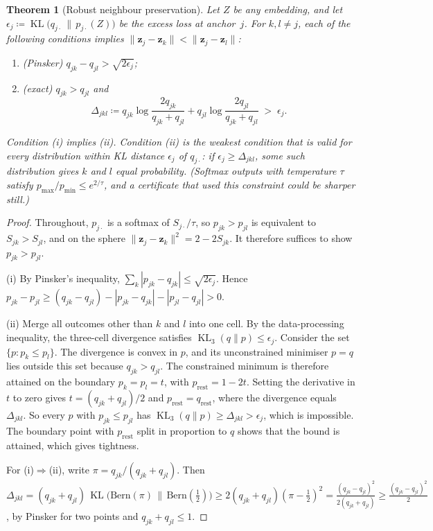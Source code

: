 \documentclass[11pt,a4paper]{article}
\theoremstyle{plain}
\newtheorem{theorem}{Theorem}[section]
\theoremstyle{definition}
\theoremstyle{remark}
\newcommand{\z}{\bm{z}}
\DeclareMathOperator{\KL}{KL}
\begin{document}
\begin{theorem}[Robust neighbour preservation]\label{thm:robustnn}
Let $Z$ be \emph{any} embedding, and let $\epsilon_j\coloneqq\KL\big(q_{j\cdot}\,\|\,p_{j\cdot}(Z)\big)$ be the excess loss at anchor~$j$. For $k,l\neq j$, each of the following conditions implies $\|\z_j-\z_k\|<\|\z_j-\z_l\|$:
\begin{enumerate}[label=(\roman*)]
  \item \emph{(Pinsker)} $q_{jk}-q_{jl}>\sqrt{2\epsilon_j}$;
  \item \emph{(exact)} $q_{jk}>q_{jl}$ and
  \[
    \Delta_{jkl}\coloneqq q_{jk}\log\frac{2q_{jk}}{q_{jk}+q_{jl}}+q_{jl}\log\frac{2q_{jl}}{q_{jk}+q_{jl}}\;>\;\epsilon_j .
  \]
\end{enumerate}
Condition (i) implies (ii). Condition (ii) is the weakest condition that is valid for every distribution within KL distance $\epsilon_j$ of $q_{j\cdot}$: if $\epsilon_j\ge\Delta_{jkl}$, some such distribution gives $k$ and $l$ equal probability. (Softmax outputs with temperature $\tau$ satisfy $p_{\max}/p_{\min}\le e^{2/\tau}$, and a certificate that used this constraint could be sharper still.)
\end{theorem}
\begin{proof}
Throughout, $p_{j\cdot}$ is a softmax of $S_{j\cdot}/\tau$, so $p_{jk}>p_{jl}$ is equivalent to $S_{jk}>S_{jl}$, and on the sphere $\|\z_j-\z_k\|^2=2-2S_{jk}$. It therefore suffices to show $p_{jk}>p_{jl}$.

(i) By Pinsker's inequality, $\sum_{k}|p_{jk}-q_{jk}|\le\sqrt{2\epsilon_j}$. Hence $p_{jk}-p_{jl}\ge(q_{jk}-q_{jl})-|p_{jk}-q_{jk}|-|p_{jl}-q_{jl}|>0$.

(ii) Merge all outcomes other than $k$ and $l$ into one cell. By the data-processing inequality, the three-cell divergence satisfies $\KL_3(q\|p)\le\epsilon_j$. Consider the set $\{p: p_k\le p_l\}$. The divergence is convex in $p$, and its unconstrained minimiser $p=q$ lies outside this set because $q_{jk}>q_{jl}$. The constrained minimum is therefore attained on the boundary $p_k=p_l=t$, with $p_{\text{rest}}=1-2t$. Setting the derivative in $t$ to zero gives $t=(q_{jk}+q_{jl})/2$ and $p_{\text{rest}}=q_{\text{rest}}$, where the divergence equals $\Delta_{jkl}$. So every $p$ with $p_{jk}\le p_{jl}$ has $\KL_3(q\|p)\ge\Delta_{jkl}>\epsilon_j$, which is impossible. The boundary point with $p_{\text{rest}}$ split in proportion to $q$ shows that the bound is attained, which gives tightness.

For (i)$\Rightarrow$(ii), write $\pi=q_{jk}/(q_{jk}+q_{jl})$. Then $\Delta_{jkl}=(q_{jk}+q_{jl})\,\KL\big(\text{Bern}(\pi)\,\|\,\text{Bern}(\tfrac12)\big)\ge 2(q_{jk}+q_{jl})(\pi-\tfrac12)^2=\frac{(q_{jk}-q_{jl})^2}{2(q_{jk}+q_{jl})}\ge\frac{(q_{jk}-q_{jl})^2}{2}$, by Pinsker for two points and $q_{jk}+q_{jl}\le1$.
\end{proof}
\end{document}
